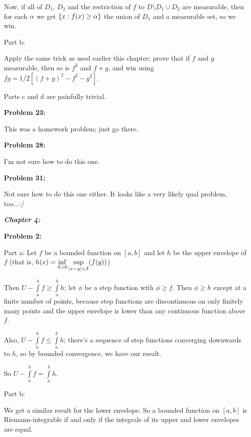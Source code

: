 \documentclass[a4paper,12pt]{article}
\begin{document}
Now, if all of $D_1$, $D_2$ and the restriction of $f$ to $D \setminus D_1 \cup D_2$ are measurable, then for each $\alpha$ we get $\{x: f(x) \geq \alpha\}$ the union of $D_1$ and a measurable set, so we win.

\shunt

Part b:

Apply the same trick as used earlier this chapter; prove that if $f$ and $g$  measurable, then so is $f^2$ and $f+g$, and win using $fg= 1/2[(f+g)^2 -f^2-g^2]$. 

\shunt

Parts c and d are painfully trivial.

{\bf Problem 23:}

This was a homework problem; just go there.

\shunt

{\bf Problem 28:}

I'm not sure how to do this one.

\shunt

{\bf Problem 31:}

Not sure how to do this one either. It looks like a very likely qual problem, too...:/

\pagebreak

{\Huge{\textit{\textbf{Chapter 4:}}}}

\shunt

{\bf Problem 2:}

Part a: Let $f$ be a bounded function on $[a,b]$ and let $h$ be the upper envelope of $f$ (that is, $h(x) = \inf\limits_{\delta>0} \sup\limits_{\left\lvert x-y \right\rvert< \delta}(f(y))$)

Then $U-\int\limits_a^b f \geq \int\limits_a^b h$; let $\phi$ be a step function with $\phi \geq f$. Then $\phi \geq h$ except at a finite number of points, because step functions are discontinuous on only finitely many points and the upper envelope is lower than any continuous function above $f$.

Also, $U-\int\limits_a^b f \leq \int\limits_a^b h$; there's a sequence of step functions converging downwards to $h$, so by bounded convergence, we have our result.

So $U-\int\limits_a^b f = \int\limits_a^b h$.

\shunt

Part b:

We get a similar result for the lower envelope. So a bounded function on $[a,b]$ is Riemann-integrable if and only if the integrals of its upper and lower envelopes are equal.
\end{document}
